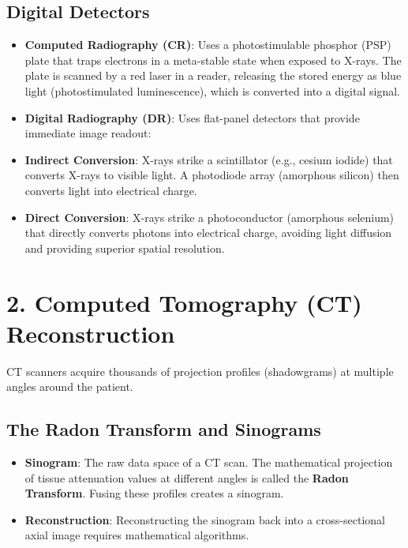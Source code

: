 \subsection*{Digital Detectors}
\begin{itemize}
    \item \textbf{Computed Radiography (CR)}: Uses a photostimulable phosphor (PSP) plate that traps electrons in a meta-stable state when exposed to X-rays. The plate is scanned by a red laser in a reader, releasing the stored energy as blue light (photostimulated luminescence), which is converted into a digital signal.
    \item \textbf{Digital Radiography (DR)}: Uses flat-panel detectors that provide immediate image readout:
\end{itemize}
  \begin{itemize}
      \item \textbf{Indirect Conversion}: X-rays strike a scintillator (e.g., cesium iodide) that converts X-rays to visible light. A photodiode array (amorphous silicon) then converts light into electrical charge.
      \item \textbf{Direct Conversion}: X-rays strike a photoconductor (amorphous selenium) that directly converts photons into electrical charge, avoiding light diffusion and providing superior spatial resolution.
  \end{itemize}


\section*{2. Computed Tomography (CT) Reconstruction}
CT scanners acquire thousands of projection profiles (shadowgrams) at multiple angles around the patient.

\subsection*{The Radon Transform and Sinograms}
\begin{itemize}
    \item \textbf{Sinogram}: The raw data space of a CT scan. The mathematical projection of tissue attenuation values at different angles is called the \textbf{Radon Transform}. Fusing these profiles creates a sinogram.
    \item \textbf{Reconstruction}: Reconstructing the sinogram back into a cross-sectional axial image requires mathematical algorithms.
\end{itemize}

